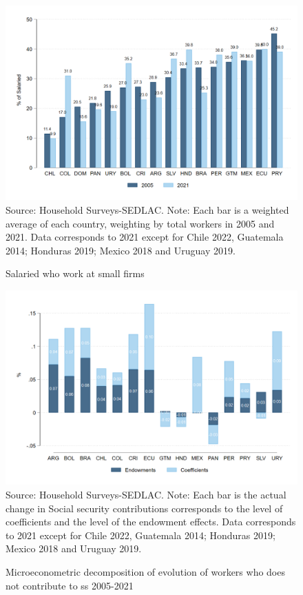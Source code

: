 \documentclass[english]{article}
\begin{document}
\begin{figure}[h!tbp]
    \justifying
     \caption{Salaried who work at small firms}     
     \includegraphics[scale=.3]{latex/figures/Snapshot/snapshot_dependents_small.png}
    \label{fig:SalariedSmall}
    \footnotesize{Source: Household Surveys-SEDLAC.}
    \footnotesize{Note: Each bar is a weighted average of each country, weighting by total workers in 2005 and 2021.  Data corresponds to 2021 except for Chile 2022, Guatemala 2014; Honduras 2019; Mexico 2018 and Uruguay 2019.}
\end{figure}

      

\begin{figure}[h!tbp]
        \justifying
        \caption{Microeconometric decomposition of evolution of workers who does not contribute to ss 2005-2021}     
        \includegraphics[scale=.3]{latex/figures/Snapshot/Oaxaca decomposition level.png}
        \label{fig:Oaxaca_level}
        \footnotesize{Source: Household Surveys-SEDLAC.}
        \footnotesize{Note: Each bar is the actual change in Social security contributions corresponds to the level of coefficients and the level of the endowment effects.  Data corresponds to 2021 except for Chile 2022, Guatemala 2014; Honduras 2019; Mexico 2018 and Uruguay 2019.}
        \end{figure}
\end{document}

